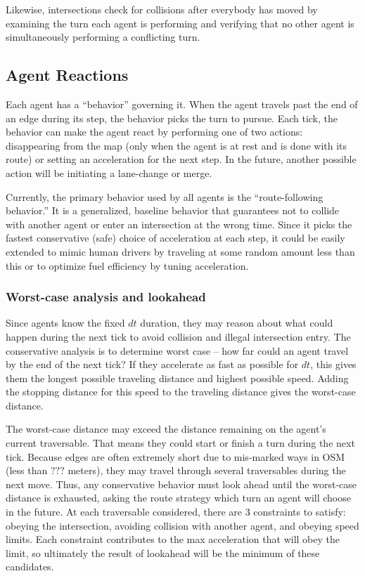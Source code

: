 \documentclass[letterpaper, 10 pt, conference]{ieeeconf}  %
\begin{document}
Likewise, intersections check for collisions after everybody has moved by
examining the turn each agent is performing and verifying that no other agent is
simultaneously performing a conflicting turn.

\subsection{Agent Reactions}

Each agent has a ``behavior'' governing it. When the agent travels past the end
of an edge during its step, the behavior picks the turn to pursue. Each tick,
the behavior can make the agent react by performing one of two actions:
disappearing from the map (only when the agent is at rest and is done with its
route) or setting an acceleration for the next step. In the future, another
possible action will be initiating a lane-change or merge.

Currently, the primary behavior used by all agents is the ``route-following
behavior.'' It is a generalized, baseline behavior that guarantees not to
collide with another agent or enter an intersection at the wrong time. Since it
picks the fastest conservative (safe) choice of acceleration at each step, it
could be easily extended to mimic human drivers by traveling at some random
amount less than this or to optimize fuel efficiency by tuning acceleration.

\subsubsection{Worst-case analysis and lookahead}

Since agents know the fixed $dt$ duration, they may reason about what could
happen during the next tick to avoid collision and illegal intersection entry.
The conservative analysis is to determine worst case -- how far could an agent
travel by the end of the next tick? If they accelerate as fast as possible for
$dt$, this gives them the longest possible traveling distance and highest
possible speed. Adding the stopping distance for this speed to the traveling
distance gives the worst-case distance.


The worst-case distance may exceed the distance remaining on the agent's current
traversable. That means they could start or finish a turn during the next tick.
Because edges are often extremely short due to mis-marked ways in OSM (less than
$???$ meters), they may travel through several traversables during the next
move. Thus, any conservative behavior must look ahead until the worst-case
distance is exhausted, asking the route strategy which turn an agent will choose
in the future. At each traversable considered, there are 3 constraints to
satisfy: obeying the intersection, avoiding collision with another agent, and
obeying speed limits. Each constraint contributes to the max acceleration that
will obey the limit, so ultimately the result of lookahead will be the minimum
of these candidates.
\end{document}
